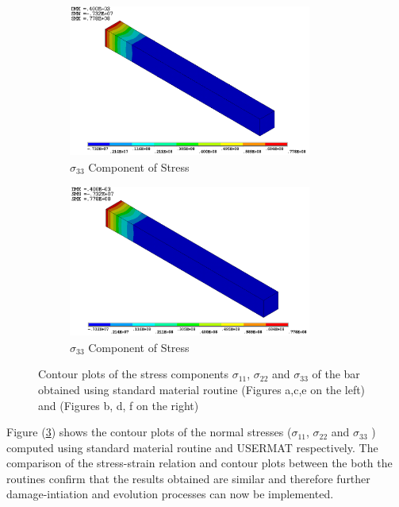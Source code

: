 \documentclass[12pt,a4paper,twoside,openright]{report}
\begin{document}
\begin{figure}[htbp!]\ContinuedFloat     
     \begin{subfigure}[b]{0.4\textwidth}
         \includegraphics[width=8cm,height=5cm]{17.Ansys_SZ.png}
         \caption{$\sigma_{33}$ Component of Stress}
         \label{fig:Z Component of Stress}
     \end{subfigure}
     \hspace{1.8cm}
     \begin{subfigure}[b]{0.4\textwidth}
         \includegraphics[width=8cm,height=5cm]{20.User_SZ.png}
         \caption{$\sigma_{33}$ Component of Stress}
         \label{fig:Z Component of Stress2}
     \end{subfigure}
        \caption{Contour plots of the stress components $\sigma_{11}$, $\sigma_{22}$ and $\sigma_{33}$ of the bar obtained using standard material routine (Figures a,c,e on the left) and  (Figures b, d, f on the right)}
        \label{fig:USERMAT}     
\end{figure}
\FloatBarrier

Figure (\ref{fig:USERMAT}) shows the contour plots of the normal stresses ($\sigma_{11}$, $\sigma_{22}$ and $\sigma_{33}$ ) computed using standard material routine and USERMAT respectively. The comparison of the stress-strain relation and contour plots between the both the routines confirm that the results obtained are similar and therefore further damage-intiation and evolution processes can now be implemented.
\end{document}
